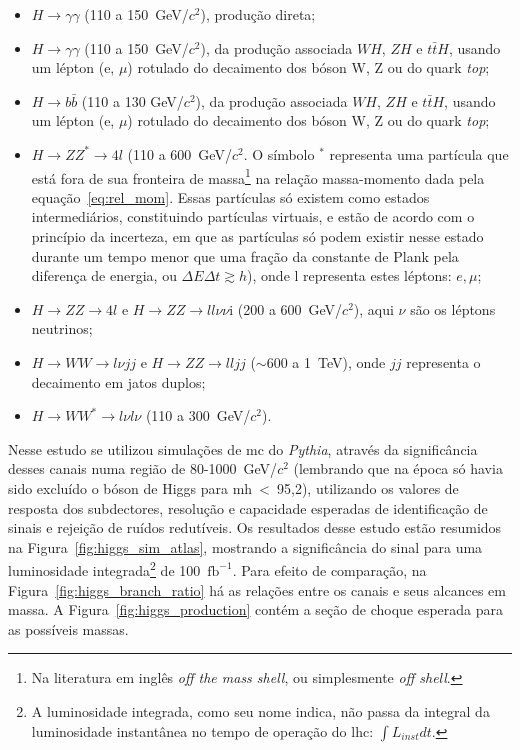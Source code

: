 \begin{itemize}
\item $H\rightarrow\gamma\gamma$ (110 a 150~GeV/$c^2$), produção direta;
\item $H\rightarrow\gamma\gamma$ (110 a 150~GeV/$c^2$), da produção associada $WH$, $ZH$ e
$t\bar{t}H$, usando um lépton (e, $\mu$) rotulado do decaimento dos bóson W, Z ou
do quark \emph{top};
\item $H\rightarrow b\bar{b}$ (110 a 130 GeV/$c^2$), da produção associada $WH$, $ZH$ e
$t\bar{t}H$, usando um lépton (e, $\mu$) rotulado do decaimento dos bóson W, Z ou
do quark \emph{top};
\item $H\rightarrow ZZ^*\rightarrow4l$ (110 a 600~GeV/$c^2$. O símbolo $^*$ representa uma partícula 
que está fora de sua fronteira de massa\footnote {Na literatura em inglês 
\emph{off the mass shell}, ou simplesmente \emph{off
shell}.} na relação massa-momento dada pela equação~\ref{eq:rel_mom}. Essas
partículas só existem como estados intermediários, constituindo partículas
virtuais, e estão de acordo com o princípio da incerteza, em que as partículas
só podem existir nesse estado durante um tempo menor que uma fração da
constante 
de Plank pela diferença de energia, ou $\Delta E \Delta t \gtrsim h$), onde l
representa estes léptons: $e,\mu$; 
\item $H\rightarrow ZZ\rightarrow4l$ e $H\rightarrow ZZ\rightarrow ll\nu\nu$i
(200 a 600~GeV/$c^2$), aqui $\nu$ são os léptons neutrinos;
\item $H\rightarrow WW\rightarrow l\nu jj$ e $H\rightarrow ZZ\rightarrow ll jj$
($\sim$600 a 1~TeV),
onde $jj$ representa o decaimento em jatos duplos;
\item $H\rightarrow WW^*\rightarrow l\nu l\nu$ (110 a 300~GeV/$c^2$). 
\end{itemize}


Nesse estudo se utilizou simulações
de \gls{mc} do \emph{Pythia}, através da significância desses 
canais numa região de 80-1000~GeV/$c^2$ (lembrando que na época só havia sido excluído
o bóson de Higgs para \gls{mh}~<~95,2), utilizando os valores de resposta dos
subdectores, resolução e capacidade esperadas de identificação de sinais e rejeição 
de ruídos redutíveis. 
Os resultados desse estudo estão resumidos na Figura~\ref{fig:higgs_sim_atlas},
mostrando a significância do sinal para uma luminosidade integrada\footnote{A 
luminosidade integrada, como seu nome indica, não passa da integral da luminosidade 
instantânea no tempo de operação do \gls{lhc}: $\int{L_{inst} dt}$.} de
100~$\text{fb}^{-1}$. Para efeito de comparação, na
Figura~\ref{fig:higgs_branch_ratio} há as relações entre os canais
e seus alcances em massa. A Figura~\ref{fig:higgs_production} contém a seção
de choque esperada para as possíveis massas.

